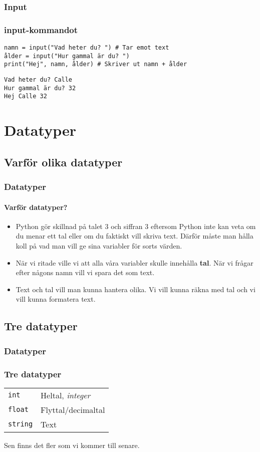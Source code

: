 \documentclass[aspectratio=169]{beamer}
\begin{document}
\begin{frame}[fragile]
	\frametitle{Input}
	\frametitle{input-kommandot}
	
	\begin{lstlisting}
namn = input("Vad heter du? ") # Tar emot text
ålder = input("Hur gammal är du? ")
print("Hej", namn, ålder) # Skriver ut namn + ålder
	\end{lstlisting}
	
	\begin{lstlisting}
Vad heter du? Calle
Hur gammal är du? 32
Hej Calle 32
	\end{lstlisting}

\end{frame}

\section{Datatyper}

\subsection{Varför olika datatyper}

\begin{frame}[fragile]
	\frametitle{Datatyper}
	\framesubtitle{Varför datatyper?}
	
	\begin{itemize}
		\item Python gör skillnad på talet 3 och siffran 3 eftersom Python inte kan veta om du menar ett tal eller om du faktiskt vill skriva text. Därför måste man hålla koll på vad man vill ge sina variabler för sorts värden.
	
		\item När vi ritade ville vi att alla våra variabler skulle innehålla \textbf{tal}. När vi frågar efter någons namn vill vi spara det som text.
	
		\item Text och tal vill man kunna hantera olika. Vi vill kunna räkna med tal och vi vill kunna formatera text.
	\end{itemize}
	
\end{frame}

\subsection{Tre datatyper}

\begin{frame}
	\frametitle{Datatyper}
	\frametitle{Tre datatyper}
	
	\begin{tabular}{ll}
		\texttt{int} & Heltal, \textit{integer}\\
		\texttt{float} & Flyttal/decimaltal\\
		\texttt{string} & Text		
	\end{tabular}
	
	Sen finns det fler som vi kommer till senare.
	
\end{frame}
\end{document}
